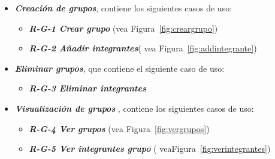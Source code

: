 \begin{itemize}
\item \textbf{\textit{Creación de grupos}}, contiene los siguientes casos de uso:
\begin{itemize}
\item\textbf{ \textit{R-G-1 Crear grupo}} (vea  Figura~\ref{fig:creargrupo})
\item\textbf{\textit{ R-G-2 Añadir integrantes}}( vea Figura~\ref{fig:addintegrante})
\end{itemize}
\item \textbf{\textit{Eliminar grupos}}, que contiene el siguiente caso de uso:
\begin{itemize}
\item   \textbf{\textit{R-G-3 Eliminar integrantes}}
\end{itemize}
\item \textbf{\textit{Visualización de grupos}} ,  contiene los siguientes casos de uso:
\begin{itemize}
\item \textbf{\textit{R-G-4 Ver grupos}} (vea Figura~\ref{fig:vergrupos})

\item  \textbf{\textit{R-G-5 Ver integrantes grupo}} ( veaFigura~\ref{fig:verintegrantes})

\end{itemize}
\end{itemize}


 





